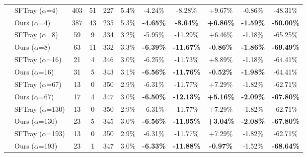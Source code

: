 \begin{table}[t]
{\begin{tabular}{ll|cccc|ccc|cc}
\addlinespace[0.3em]

 & SFTray ($\alpha$=4) & 403 & 51 & 227 & 5.4\% & -4.24\% & -8.28\% & +9.67\% & -0.86\% & -48.31\% \\

 & Ours ($\alpha$=4) & 387 & 43 & 235 & 5.3\% & \textbf{-4.65\%} & \textbf{-8.64\%} & \textbf{+6.86\%} & \textbf{-1.59\%} & \textbf{-50.00\%} \\

\addlinespace[0.3em]

 & SFTray ($\alpha$=8) & 59 & 9 & 334 & 3.2\% & -5.95\% & -11.29\% & +6.46\% & -1.18\% & -65.25\% \\

 & Ours ($\alpha$=8) & 63 & 11 & 332 & 3.3\% & \textbf{-6.39\%} & \textbf{-11.67\%} & \textbf{-0.86\%} & \textbf{-1.86\%} & \textbf{-69.49\%} \\

\addlinespace[0.3em]

 & SFTray ($\alpha$=16) & 21 & 4 & 346 & 3.0\% & -6.25\% & -11.73\% & +8.89\% & -1.18\% & -64.41\% \\

 & Ours ($\alpha$=16) & 31 & 5 & 343 & 3.1\% & \textbf{-6.56\%} & \textbf{-11.76\%} & \textbf{-0.52\%} & \textbf{-1.98\%} & -64.41\% \\

\addlinespace[0.3em]

 & SFTray ($\alpha$=67) & 13 & 0 & 350 & 2.9\% & -6.31\% & -11.77\% & +7.29\% & -1.82\% & -62.71\% \\

 & Ours ($\alpha$=67) & 17 & 4 & 347 & 3.0\% & \textbf{-6.50\%} & \textbf{-12.13\%} & \textbf{+5.16\%} & \textbf{-2.09\%} & \textbf{-67.80\%} \\

\addlinespace[0.3em]

 & SFTray ($\alpha$=130) & 13 & 0 & 350 & 2.9\% & -6.31\% & -11.77\% & +7.29\% & -1.82\% & -62.71\% \\

 & Ours ($\alpha$=130) & 23 & 5 & 345 & 3.0\% & \textbf{-6.56\%} & \textbf{-11.95\%} & \textbf{+3.04\%} & \textbf{-2.08\%} & \textbf{-67.80\%} \\

\addlinespace[0.3em]

 & SFTray ($\alpha$=193) & 13 & 0 & 350 & 2.9\% & -6.31\% & -11.77\% & +7.29\% & -1.82\% & -62.71\% \\

 & Ours ($\alpha$=193) & 23 & 1 & 347 & 3.0\% & \textbf{-6.33\%} & \textbf{-11.88\%} & \textbf{-0.97\%} & -1.52\% & \textbf{-68.64\%} \\


\end{tabular}}
\end{table}
